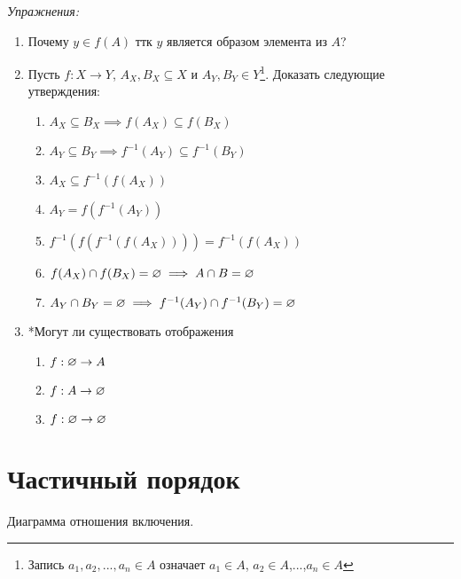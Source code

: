 \vspace{1em}
{\it Упражнения:}
\begin{enumerate}
	\item{}Почему $y\in f(A)$ ттк $y$ является образом элемента из $A$?
	\item{}Пусть ${f:X\to Y}$, ${A_{X},B_{X}\subseteq X}$ и
	${A_{Y},B_{Y}\in Y}$\footnote{Запись $a_1,a_2,...,a_{n}\in A$ означает
	$a_1\in A$, $a_2\in A$,...,$a_{n}\in A$}.
	Доказать следующие утверждения:
	\begin{enumerate}
		\item{}$A_{X}\subseteq B_{X}\implies f(A_{X})\subseteq f(B_{X})$
		\item{}$A_{Y}\subseteq B_{Y}\implies f^{-1}(A_{Y})\subseteq f^{-1}(B_{Y})$
		\item{}$A_{X}\subseteq f^{-1}(f(A_{X}))$
		\item{}$A_{Y}=f(f^{-1}(A_{Y}))$
		\item{}$f^{-1}(f(f^{-1}(f(A_{X}))))=f^{-1}(f(A_{X}))$
		\item{}$f(A_{X})\cap f(B_{X})=\varnothing\implies A\cap B=\varnothing$
		\item{}$A_{Y}\cap B_{Y}=\varnothing\implies f^{-1}(A_{Y})\cap f^{-1}(B_{Y})=\varnothing$
	\end{enumerate}
	\item{}*Могут ли существовать отображения
	\begin{multicols}{3}
		\begin{enumerate}
			\item{}$f:\varnothing\to A$
			\item{}$f:A\to\varnothing$
			\item{}$f:\varnothing\to\varnothing$
		\end{enumerate}
	\end{multicols}
\end{enumerate}

\section{Частичный порядок}

\begin{marginfigure}[1cm]
	\center

	\caption{Диаграмма отношения включения.}\label{fig:inc_diag}
\end{marginfigure}


